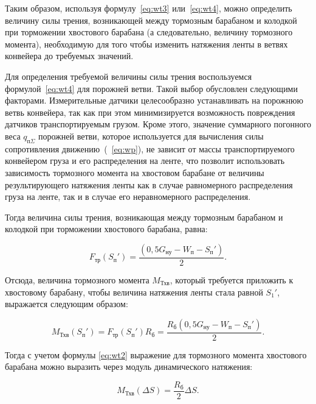 Таким образом, используя формулу~\ref{eq:wt3} или~\ref{eq:wt4}, можно определить величину силы трения, возникающей между тормозным барабаном и колодкой при торможении хвостового барабана (а следовательно, величину тормозного момента), необходимую для того чтобы изменить натяжения ленты в ветвях конвейера до требуемых значений.

Для определения требуемой величины силы трения воспользуемся формулой~\ref{eq:wt4} для порожней ветви. Такой выбор обусловлен следующими факторами. Измерительные датчики целесообразно устанавливать на порожнюю ветвь конвейера, так как при этом минимизируется возможность повреждения датчиков транспортируемым грузом. Кроме этого, значение суммарного погонного веса $ q_{\text{п}\Sigma} $ порожней ветви, которое используется для вычисления силы сопротивления движению~(~\ref{eq:wp}), не зависит от массы транспортируемого конвейером груза и его распределения на ленте, что позволит использовать зависимость тормозного момента на хвостовом барабане от величины результирующего натяжения ленты как в случае равномерного распределения груза на ленте, так и в случае его неравномерного распределения.

Тогда величина силы трения, возникающая между тормозным барабаном и колодкой при торможении хвостового барабана, равна:

$$ F_{\text{тр}}(S_{\text{п}}') = \frac{(0,5G_{\text{ну}} - W_{\text{п}} - S_{\text{п}}')}{2}. $$

Отсюда, величина тормозного момента $ M_{\text{Тхв}} $, который требуется приложить к хвостовому барабану, чтобы величина натяжения ленты стала равной $ S_1' $, выражается следующим образом:

$$
M_{\text{Тхв}}(S_{\text{п}}') = F_{\text{тр}}(S_{\text{п}}')R_{\text{б}} = \frac{R_{\text{б}}(0,5G_{\text{ну}} - W_{\text{п}} - S_{\text{п}}')}{2}.
$$

Тогда с учетом формулы \ref{eq:wt2} выражение для тормозного момента хвостового барабана можно выразить через модуль динамического натяжения:

\begin{equation}
\label{eq:wtres}
M_{\text{Тхв}}(\Delta S) = \frac{R_{\text{б}}}{2} \Delta S.
\end{equation}

